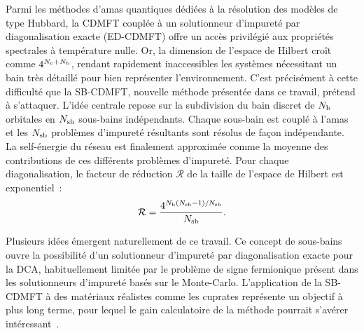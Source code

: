 Parmi les méthodes d'amas quantiques dédiées à la résolution des modèles de type Hubbard, la CDMFT couplée à un solutionneur d'impureté par diagonalisation exacte (ED-CDMFT) offre un accès privilégié aux propriétés spectrales à température nulle. Or, la dimension de l'espace de Hilbert croît comme $4^{N_{\rm c} + N_{\rm b}}$, rendant rapidement inaccessibles les systèmes nécessitant un bain très détaillé pour bien représenter l'environnement. C'est précisément à cette difficulté que la SB-CDMFT, nouvelle méthode présentée dans ce travail, prétend à s'attaquer. L'idée centrale repose sur la subdivision du bain discret de $N_{\rm b}$ orbitales en $N_{\rm sb}$ sous-bains indépendants. Chaque sous-bain est couplé à l'amas et les $N_{\rm sb}$ problèmes d'impureté résultants sont résolus de façon indépendante. La self-énergie du réseau est finalement approximée comme la moyenne des contributions de ces différents problèmes d'impureté. Pour chaque diagonalisation, le facteur de réduction $\mathcal{R}$ de la taille de l'espace de Hilbert est exponentiel~:
\begin{align}
    \mathcal{R} = \frac{4^{N_{\rm b}(N_{\rm sb} - 1)/N_{\rm sb}}}{N_{\rm sb}}.
\end{align}

Plusieurs idées émergent naturellement de ce travail. Ce concept de sous-bains ouvre la possibilité d'un solutionneur d'impureté par diagonalisation exacte pour la DCA, habituellement limitée par le problème de signe fermionique présent dans les solutionneurs d'impureté basés sur le Monte-Carlo. L'application de la SB-CDMFT à des matériaux réalistes comme les cuprates représente un objectif à plus long terme, pour lequel le gain calculatoire de la méthode pourrait s'avérer intéressant~\cite{bbl-prx}.
